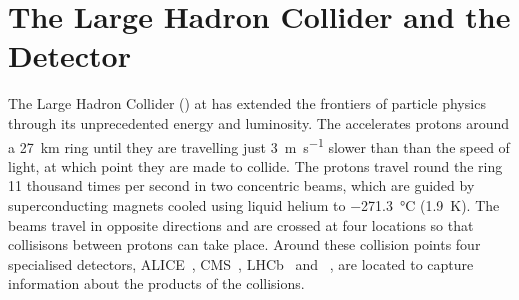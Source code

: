 \chapter{The Large Hadron Collider and the \ATLAS Detector}\label{chap:lhc_atlas}


The Large Hadron Collider (\LHC) at \CERN has extended the frontiers of particle physics through its unprecedented energy and luminosity.
The \LHC accelerates protons around a \SI{27}{\km} ring until they are travelling just \SI{3}{\m\per\s} slower than than the speed of light, at which point they are made to collide.
The protons travel round the ring 11 thousand times per second in two concentric beams, which are guided by superconducting magnets cooled using liquid helium to \SI{-271.3}{\degreeCelsius} (\SI{1.9}{\kelvin}).
The beams travel in opposite directions and are crossed at four locations so that collisisons between protons can take place.
Around these collision points four specialised detectors, ALICE~\cite{AliceCollaboration_2008}, CMS~\cite{CMS-TDR-08-001}, LHCb~\cite{LHCbCollaboration_2008} and \ATLAS~\cite{PERF-2007-01}, are located to capture information about the products of the collisions.

